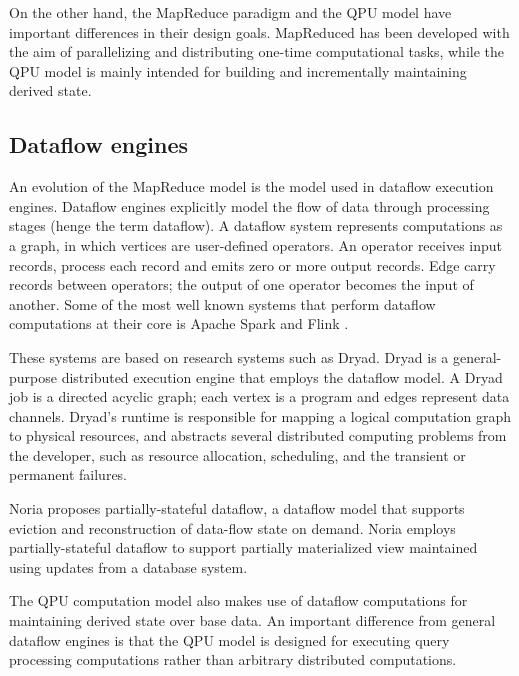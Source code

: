On the other hand, the MapReduce paradigm and the QPU model have important differences in their design goals.
MapReduced has been developed with the aim of parallelizing and distributing one-time computational tasks,
while the QPU model is mainly intended for building and incrementally maintaining derived state.

\subsection{Dataflow engines}
An evolution of the MapReduce model is the model used in dataflow execution engines.
Dataflow engines explicitly model the flow of data through processing stages (henge the term dataflow).
A dataflow system represents computations as a graph, in which vertices are user-defined operators.
An operator receives input records, process each record and emits zero or more output records.
Edge carry records between operators; the output of one operator becomes the input of another.
Some of the most well known systems that perform dataflow computations at their core is
Apache Spark \cite{zaharia:spark} and Flink \cite{carbone:flink}.

These systems are based on research systems such as Dryad.
Dryad \cite{isard:dryad} is a general-purpose distributed execution engine that employs the dataflow model.
A Dryad job is a directed acyclic graph; each vertex is a program and edges represent data channels.
Dryad's runtime is responsible for mapping a logical computation graph to physical resources,
and abstracts several distributed computing problems from the developer,
such as resource allocation, scheduling, and the transient or permanent failures.

Noria \cite{gjengset:noria} proposes partially-stateful dataflow,
a dataflow model that supports eviction and reconstruction of data-flow state on demand.
Noria employs partially-stateful dataflow to support partially materialized view maintained
using updates from a database system.

The QPU computation model also makes use of dataflow computations for maintaining derived state
over base data.
An important difference from general dataflow engines is that the QPU model is designed for executing
query processing computations rather than arbitrary distributed computations.
